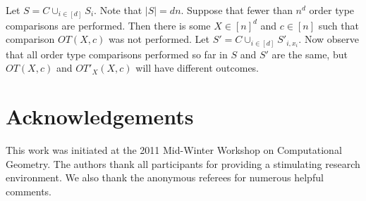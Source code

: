 \documentclass[leqno,12pt]{article}
\newenvironment{proof}{\unskip{\bf Proof:}}{\unskip{\hfill $\Box$}}
\begin{document}
\begin{proof}
Let $S=C \cup_{i\in[d]} S_i$. Note that $|S|=dn$. Suppose that  fewer than $n^d$ order type comparisons are performed. Then there is some $X\in [n]^d$ and $c\in [n]$ such that comparison $OT(X,c)$
was not performed. Let $S'=C \cup_{i\in[d]} S'_{i,x_i}$. Now observe that all order type comparisons performed so far in $S$ and $S'$ are the same, but 
$OT(X,c)$ and $OT'_X(X,c)$ will have different outcomes.
\end{proof}
\fi

\section*{Acknowledgements}
This work was initiated at the 2011 Mid-Winter
Workshop on Computational Geometry. The authors thank all participants
for providing a stimulating research environment. We also thank the
anonymous referees for numerous helpful comments.

   
\end{document}
